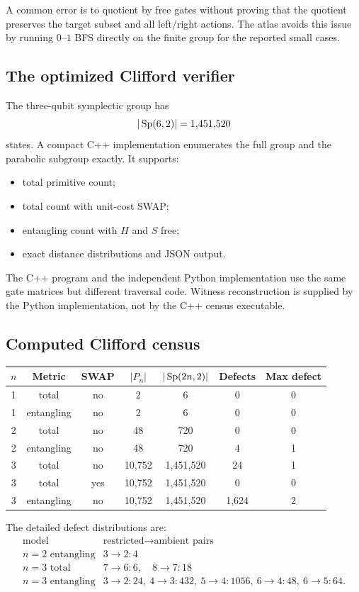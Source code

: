 A common error is to quotient by free gates without proving that the quotient preserves the target subset and all left/right actions.  The atlas avoids this issue by running $0$--$1$ BFS directly on the finite group for the reported small cases.

\subsection{The optimized Clifford verifier}
The three-qubit symplectic group has
\[
|\operatorname{Sp}(6,2)|=1{,}451{,}520
\]
states.  A compact C++ implementation enumerates the full group and the parabolic subgroup exactly.  It supports:
\begin{itemize}
\item total primitive count;
\item total count with unit-cost SWAP;
\item entangling count with $H$ and $S$ free;
\item exact distance distributions and JSON output.
\end{itemize}
The C++ program and the independent Python implementation use the same gate matrices but different traversal code.  Witness reconstruction is supplied by the Python implementation, not by the C++ census executable.

\subsection{Computed Clifford census}
\begin{longtable}{@{}ccccccc@{}}
\toprule
$n$ & Metric & SWAP & $|P_n|$ & $|\operatorname{Sp}(2n,2)|$ & Defects & Max defect\\
\midrule
1 & total & no & 2 & 6 & 0 & 0\\
1 & entangling & no & 2 & 6 & 0 & 0\\
2 & total & no & 48 & 720 & 0 & 0\\
2 & entangling & no & 48 & 720 & 4 & 1\\
3 & total & no & 10,752 & 1,451,520 & 24 & 1\\
3 & total & yes & 10,752 & 1,451,520 & 0 & 0\\
3 & entangling & no & 10,752 & 1,451,520 & 1,624 & 2\\
\bottomrule
\end{longtable}

The detailed defect distributions are:
\[
\begin{array}{c|l}
\text{model}&\text{restricted}\to\text{ambient pairs}\\
\hline
n=2\text{ entangling}&3\to2:4\\
n=3\text{ total}&7\to6:6,\quad8\to7:18\\
n=3\text{ entangling}&3\to2:24,\ 4\to3:432,\ 5\to4:1056,\ 6\to4:48,\ 6\to5:64.
\end{array}
\]


